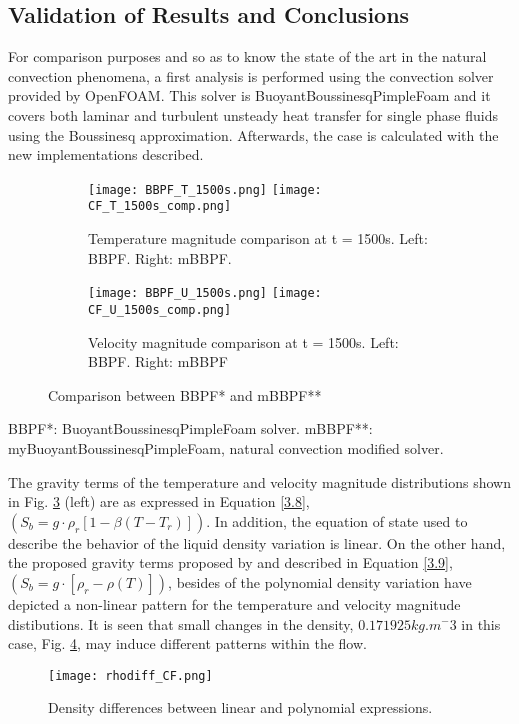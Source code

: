 \subsection{Validation of Results and Conclusions}
For comparison purposes and so as to know the state of the art in the natural convection phenomena, a first analysis is performed using the convection solver provided by OpenFOAM. This solver is BuoyantBoussinesqPimpleFoam and it covers both laminar and turbulent unsteady heat transfer for single phase fluids using the Boussinesq approximation. Afterwards, the case is calculated with the new implementations described.
\begin{figure}[h!]
	\centering
	\begin{subfigure}{\linewidth}
	\texttt{[image: BBPF\_T\_1500s.png]}\hfill
	\texttt{[image: CF\_T\_1500s\_comp.png]}	
	\caption{Temperature magnitude comparison at t = 1500s. Left: BBPF. Right: mBBPF.}
	\label{3.5figa}
	\end{subfigure}\par\medskip
	\begin{subfigure}{\linewidth}
	\texttt{[image: BBPF\_U\_1500s.png]}\hfill
	\texttt{[image: CF\_U\_1500s\_comp.png]}	
	\caption{Velocity magnitude comparison at t = 1500s. Left: BBPF. Right: mBBPF}
	\label{3.5figb}
	\end{subfigure}\par\medskip
	\caption{Comparison between BBPF* and mBBPF**}
	\label{3.5fig}
\end{figure}
\newline 
BBPF*: BuoyantBoussinesqPimpleFoam solver.
mBBPF**: myBuoyantBoussinesqPimpleFoam, natural convection modified solver.

\noindent The gravity terms of the temperature and velocity magnitude distributions shown in Fig. \ref{3.5fig} (left) are as expressed in Equation \ref{3.8}, $(S_{b} = g\cdot\rho_{r}[1-\beta(T-T_{r})])$. In addition, the equation of state used to describe the behavior of the liquid density variation is linear. On the other hand, the proposed gravity terms proposed by \cite{bourdillon_2016} and described in Equation \ref{3.9}, $(S_{b} = g\cdot[\rho_{r}-\rho(T)])$, besides of the polynomial density variation have depicted a non-linear pattern for the temperature and velocity magnitude distibutions. It is seen that small changes in the density, $0.171925 kg.m^-3$ in this case, Fig. \ref{rhodifffig}, may induce different patterns within the flow. 
\clearpage
\begin{figure}[h!]
	\centering
	\texttt{[image: rhodiff\_CF.png]}\hfill
	\caption{Density differences between linear and polynomial expressions.}
	\label{rhodifffig}
\end{figure} 

